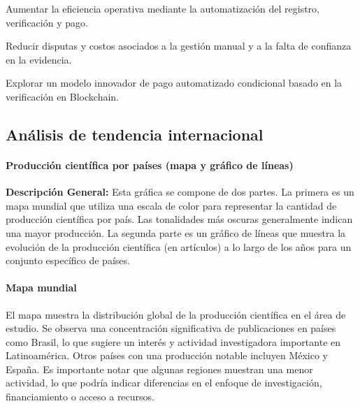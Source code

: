 Aumentar la eficiencia operativa mediante la automatización del registro, verificación y pago. 

Reducir disputas y costos asociados a la gestión manual y a la falta de confianza en la evidencia. 

Explorar un modelo innovador de pago automatizado condicional basado en la verificación en Blockchain. 

\subsection{Análisis de tendencia internacional}
\paragraph{Producción científica por países (mapa y gráfico de líneas)}
 
 \textbf{Descripción General:} Esta gráfica se compone de dos partes. La primera es un mapa mundial que utiliza una escala de color para representar la cantidad de producción científica por país. Las tonalidades más oscuras generalmente indican una mayor producción. La segunda parte es un gráfico de líneas que muestra la evolución de la producción científica (en artículos) a lo largo de los años para un conjunto específico de países. 
\paragraph{Mapa mundial}
El mapa muestra la distribución global de la producción científica en el área de estudio. Se observa una concentración significativa de publicaciones en países como Brasil, lo que sugiere un interés y actividad investigadora importante en Latinoamérica. Otros países con una producción notable incluyen México y España. Es importante notar que algunas regiones muestran una menor actividad, lo que podría indicar diferencias en el enfoque de investigación, financiamiento o acceso a recursos. 

